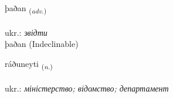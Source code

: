 \documentclass[frontgrid, backgrid]{flacards}\usepackage[]{graphicx}\usepackage[]{xcolor}
\begin{document}

\renewcommand{\flhead}{\vskip5pt \fboxsep=0pt {\small\bfseries\footnotesize Atviksorð | прислівник}}
\renewcommand{\fcfoot}{\vskip5pt \fboxsep=0pt \hspace{2pt}{\small\bfseries\footnotesize 1K}}

\renewcommand{\blhead}{\vskip5pt {\small\bfseries\footnotesize Atviksorð | прислівник }}
\renewcommand{\bcfoot}{\vskip5pt \hspace{2pt}{\small\bfseries\footnotesize 1K}}


{þaðan \small{\textsubscript{(\textit{adv.})}} \\[1ex]
\textphonetic{[θaːðan]} \\
ukr.: \emph{звідти} \\  [2ex]
þaðan (Indeclinable)}

\renewcommand{\flhead}{\vskip5pt \fboxsep=0pt {\small\bfseries\footnotesize Nafnorð | іменник}}
\renewcommand{\fcfoot}{\vskip5pt \fboxsep=0pt \hspace{2pt}{\small\bfseries\footnotesize 1K}}

\renewcommand{\blhead}{\vskip5pt {\small\bfseries\footnotesize Nafnorð | іменник }}
\renewcommand{\bcfoot}{\vskip5pt \hspace{2pt}{\small\bfseries\footnotesize 1K}}


{ráðuneyti \small{\textsubscript{(\textit{n.})}} \\[1ex] %
\textphonetic{[rauːðʏneitɪ]} \\
ukr.: \emph{міністерство; відомство; департамент} \\  [2ex]
\renewcommand*{\arraystretch}{0.8}
}

\renewcommand{\flhead}{\vskip5pt \fboxsep=0pt {\small\bfseries\footnotesize Nafnorð | іменник}}
\renewcommand{\fcfoot}{\vskip5pt \fboxsep=0pt \hspace{2pt}{\small\bfseries\footnotesize 1K}}
\end{document}
